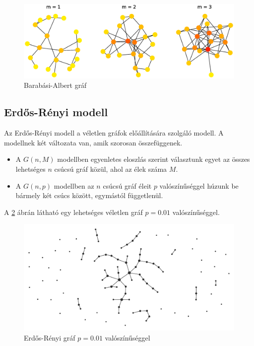 \documentclass[12pt]{report}
\begin{document}
\begin{figure}[H]
	\begin{center}
		\includegraphics[width=0.9\linewidth]{pictures/Barabasi_albert_graph.eps}
		\caption{Barabási-Albert gráf \cite{wikipedia_barabasi}}
		\label{barabasi}
	\end{center}
\end{figure}

\pagebreak

\subsection{Erdős-Rényi modell}

Az Erdős-Rényi modell \cite{erdos59a} a véletlen gráfok előállítására szolgáló modell.
A modellnek két változata van, amik szorosan összefüggenek.
\begin{itemize}
	\item A \(G(n, M)\) modellben egyenletes eloszlás szerint választunk egyet az összes lehetséges \(n\) csúcsú gráf közül, ahol az élek száma \(M\).
	\item A \(G(n, p)\) modellben az \(n\) csúcsú gráf éleit \(p\) valószínűséggel húzunk be bármely két csúcs között, egymástól függetlenül.
\end{itemize}

A \ref{erdos} ábrán látható egy lehetséges véletlen gráf \(p=0.01\) valószínűséggel.

\begin{figure}[H]
	\begin{center}
		\includegraphics[width=0.9\linewidth]{pictures/Erdos_generated_network-p001.jpg}
		\caption{Erdős-Rényi gráf \(p=0.01\) valószínűséggel \cite{wikipedia_erdos}}
		\label{erdos}
	\end{center}
\end{figure}
\end{document}
